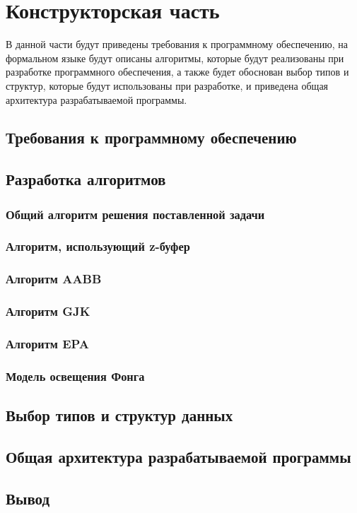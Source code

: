\section{Конструкторская часть}


В данной части будут приведены требования к программному обеспечению, на формальном языке будут описаны алгоритмы, которые будут реализованы при разработке программного обеспечения, а также будет обоснован выбор типов и структур, которые будут использованы при разработке, и приведена общая архитектура разрабатываемой программы.

\subsection{Требования к программному обеспечению}


\subsection{Разработка алгоритмов}

\subsubsection{Общий алгоритм решения поставленной задачи}

\subsubsection{Алгоритм, использующий z-буфер}

\subsubsection{Алгоритм AABB}

\subsubsection{Алгоритм GJK}

\subsubsection{Алгоритм EPA}

\subsubsection{Модель освещения Фонга}

\subsection{Выбор типов и структур данных}

\subsection{Общая архитектура разрабатываемой программы}


\subsection*{Вывод}

